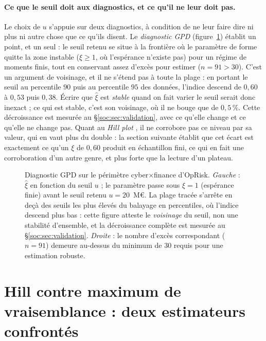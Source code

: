 \paragraph{Ce que le seuil doit aux diagnostics, et ce qu'il ne leur doit pas.} Le choix de $u$
s'appuie sur deux diagnostics, à condition de ne leur faire dire ni plus ni autre chose que ce
qu'ils disent. Le \emph{diagnostic GPD} (figure~\ref{soc:fig:diagnostic-gpd}) établit un point,
et un seul : le seuil retenu se situe à la frontière où le paramètre de forme quitte la zone
instable ($\xi \geq 1$, où l'espérance n'existe pas) pour un régime de moments finis, tout en
conservant assez d'excès pour estimer ($n = 91 > 30$). C'est un argument de voisinage,
et il ne s'étend pas à toute la plage : en portant le seuil au percentile $90$ puis au percentile
$95$ des données, l'indice descend de $0{,}60$ à $0{,}53$ puis $0{,}38$. Écrire que
$\hat\xi$ est \emph{stable} quand on fait varier le seuil serait donc inexact ; ce qui est
stable, c'est son voisinage, où il ne bouge que de $0{,}5\,\%$. Cette décroissance est mesurée
au \S\ref{soc:sec:validation}, avec ce qu'elle change et ce qu'elle ne change pas. Quant au
\emph{Hill plot} \matcomp, il ne corrobore pas ce niveau par sa valeur,
qui en vaut plus du double : la section suivante établit que cet écart est exactement ce qu'un
$\xi$ de $0{,}60$ produit en échantillon fini, ce qui en fait une corroboration d'un autre
genre, et plus forte que la lecture d'un plateau.

\begin{figure}[htbp]
\centering
{}
\caption{Diagnostic GPD sur le périmètre cyber$\times$finance d'OpRisk.
\emph{Gauche} : $\hat{\xi}$ en fonction du seuil $u$ ; le paramètre passe sous
$\xi = 1$ (espérance finie) avant le seuil retenu $u = 20$~M\euro. La plage tracée
s'arrête en deçà des seuils les plus élevés du balayage en percentiles, où l'indice
descend plus bas : cette figure atteste le \emph{voisinage} du seuil, non une stabilité
d'ensemble, et la décroissance complète est mesurée au \S\ref{soc:sec:validation}.
\emph{Droite} : le nombre d'excès correspondant ($n = 91$) demeure au-dessus du
minimum de $30$ requis pour une estimation robuste.}
\label{soc:fig:diagnostic-gpd}
\end{figure}

\section{Hill contre maximum de vraisemblance : deux estimateurs confrontés}

